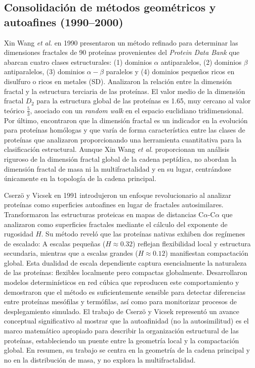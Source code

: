 \subsection{Consolidaci\'{o}n de m\'{e}todos geom\'{e}tricos y autoafines (1990--2000)}


Xin Wang \textit{et al.} \cite{Wang1990} en 1990 presentaron un m\'{e}todo refinado para determinar las dimensiones fractales de 90 prote\'{i}nas provenientes del \textit{Protein Data Bank} que abarcan cuatro clases estructurales: (1) dominios $\alpha$ antiparalelos, (2) dominios $\beta$ antiparalelos, (3) dominios $\alpha-\beta$ paralelos y (4) dominios pequeños ricos en disulfuro o ricos en metales (SD). Analizaron la relaci\'{o}n entre la dimensi\'{o}n fractal y la estructura terciaria de las prote\'{i}nas. El valor medio de la dimensi\'{o}n fractal $D_{2}$ para la estructura global de las prote\'{i}nas es 1.65, muy cercano al valor te\'{o}rico $\frac{5}{3}$, asociado con un \textit{random walk} en el espacio euclidiano tridimensional. Por \'{u}ltimo, encontraron que la dimensi\'{o}n fractal es un indicador en la evoluci\'{o}n para prote\'{i}nas hom\'{o}logas y que var\'{i}a de forma caracter\'{i}stica entre las clases de prote\'{i}nas que analizaron proporcionando una herramienta cuantitativa para la clasificaci\'{o}n estructural. Aunque Xin Wang \textit{et al.} proporcionan un análisis riguroso de la dimensión fractal global de la cadena peptídica, no abordan la dimensión fractal de masa ni la multifractalidad y en su lugar, centrándose únicamente en la topología de la cadena principal.

Cserzö y Vicsek en 1991 \cite{Cserzo1991} introdujeron un enfoque revolucionario al analizar prote\'{i}nas como superficies autoafines en lugar de fractales autosimilares. Transformaron las estructuras proteicas en mapas de distancias C$\alpha$-C$\alpha$ que analizaron como superficies fractales mediante el c\'{a}lculo del exponente de rugosidad $H$. Su m\'{e}todo revel\'{o} que las prote\'{i}nas nativas exhiben dos reg\'{i}menes de escalado: A escalas pequeñas ($H \approx 0.32$) reflejan flexibilidad local y estructura secundaria, mientras que a escalas grandes ($H \approx 0.12$) manifiestan compactaci\'{o}n global. Esta dualidad de escala dependiente captura esencialmente la naturaleza de las prote\'{i}nas: flexibles localmente pero compactas globalmente. Desarrollaron modelos determin\'{i}sticos en red c\'{u}bica que reproducen este comportamiento y demostraron que el m\'{e}todo es suficientemente sensible para detectar diferencias entre prote\'{i}nas mes\'{o}filas y term\'{o}filas, as\'{i} como para monitorizar procesos de desplegamiento simulado. El trabajo de Cserzö y Vicsek represent\'{o} un avance conceptual significativo al mostrar que la autoafinidad (no la autosimilitud) es el marco matem\'{a}tico apropiado para describir la organizaci\'{o}n estructural de las prote\'{i}nas, estableciendo un puente entre la geometr\'{i}a local y la compactaci\'{o}n global.  En resumen, su trabajo se centra en la geometría de la cadena principal y no en la distribución de masa, y no explora la multifractalidad.


